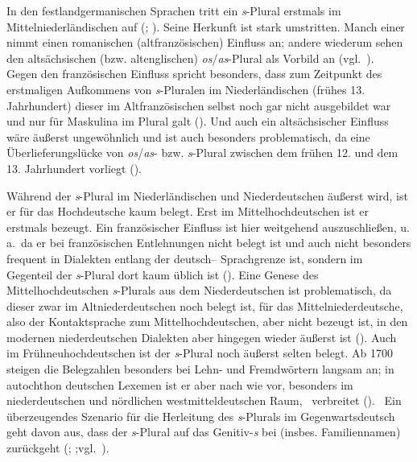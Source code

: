   
 In den festlandgermanischen Sprachen tritt ein \textit{s}-Plural erstmals im Mittelniederländischen auf (\citealt{NueblingSchmuck2010}; \citealt[422–425]{Schirmunski1962}). Seine Herkunft ist stark umstritten. Manch einer nimmt einen romanischen (altfranzösischen) Einfluss an; andere wiederum sehen den altsächsischen (bzw. altenglischen) \textit{os}/\textit{as}-Plural als Vorbild an (vgl.\, \citealt{Philippa1981, Philippa1982,Oehmann1924}). \,%
 Gegen den französischen Einfluss spricht besonders, dass zum Zeitpunkt des erstmaligen Aufkommens von \textit{s}-Pluralen im Niederländischen (frühes 13. Jahrhundert) dieser im Altfranzösischen selbst noch gar nicht ausgebildet war und nur für Maskulina im  Plural galt (\citealt[150]{NueblingSchmuck2010}). Und auch ein altsächsischer Einfluss wäre äußerst ungewöhnlich und ist auch besonders problematisch, da eine Überlieferungslücke von \textit{os}/\textit{as}- bzw. \textit{s}-Plural zwischen dem frühen 12. und dem 13. Jahrhundert vorliegt (\citealt[151]{NueblingSchmuck2010}).

 
Während der  \textit{s}-Plural im Niederländischen und Niederdeutschen äußerst  wird, ist er für das Hochdeutsche kaum belegt. Erst im Mittelhochdeutschen ist er erstmals bezeugt. Ein französischer Einfluss ist hier weitgehend auszuschließen, u.\,a.\, da er bei französischen Entlehnungen nicht belegt ist und auch nicht besonders frequent in Dialekten entlang der deutsch– Sprachgrenze ist, sondern im Gegenteil der \textit{s}-Plural dort kaum üblich ist (\citealt[122–126]{Oehmann1924}). Eine Genese des Mittelhochdeutschen \textit{s}-Plurals aus dem Niederdeutschen ist problematisch, da dieser zwar im Altniederdeutschen noch belegt ist, für das Mittelniederdeutsche, also der Kontaktsprache zum Mittelhochdeutschen, aber nicht bezeugt ist, in den modernen niederdeutschen Dialekten aber hingegen wieder äußerst  ist (\citealt[147–150]{Lindowetal1998}). Auch im Frühneuhochdeutschen ist der \textit{s}-Plural noch äußerst selten belegt. Ab 1700 steigen die Belegzahlen besonders bei Lehn- und Fremdwörtern langsam an; in autochthon deutschen Lexemen ist er aber nach wie vor, besonders im niederdeutschen und nördlichen westmitteldeutschen Raum, \,%
verbreitet (\citealt[266]{Wegera1987}). \,%
Ein überzeugendes Szenario für die Herleitung des \textit{s}-Plurals im Gegenwartsdeutsch geht davon aus, dass der \textit{s}-Plural auf das Genitiv-\textit{s} bei  (insbes. Familiennamen) zurückgeht (\citealt[93]{Wegener2004}; \citealt{NueblingSchmuck2010};vgl.\, \citealt[436f]{Schirmunski1962}).
   
